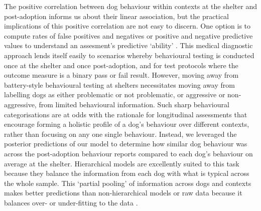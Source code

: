 \documentclass[fleqn,10pt]{wlscirep}
\begin{document}
The positive correlation between dog behaviour within contexts at the shelter and post-adoption informs us about their linear association, but the practical implications of this positive correlation are not easy to discern. One option is to compute rates of false positives and negatives \cite{marder2013} or positive and negative predictive values \cite{patbrad2016} to understand an assesment's predictive `ability' \cite{patronek2019}. This medical diagnostic approach lends itself easily to scenarios whereby behavioural testing is conducted once at the shelter and once post-adoption, and for test protocols where the outcome measure is a binary pass or fail result. However, moving away from battery-style behavioural testing at shelters necessitates moving away from labelling dogs as either problematic or not problematic, or aggressive or non-aggressive, from limited behavioural information. Such sharp behavioural categorisations are at odds with the rationale for longitudinal assessments \cite{ASPCA2018,rayment2015} that encourage forming a holistic profile of a dog's behaviour over different contexts, rather than focusing on any one single behaviour. Instead, we leveraged the posterior predictions of our model to determine how similar dog behaviour was across the post-adoption behaviour reports compared to each dog's behaviour on average at the shelter. Hierarchical models are excellently suited to this task because they balance the information from each dog with what is typical across the whole sample. This `partial pooling' of information across dogs and contexts makes better predictions than non-hierarchical models or raw data because it balances over- or under-fitting to the data \cite{gelman2007, mcelreath2014}.
\end{document}
